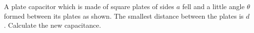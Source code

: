 \documentclass[fleqn, a4paper, 12pt, twoside]{article}
\theoremstyle{definition}
\theoremstyle{theorem}
\begin{document}
\begin{question}
	A plate capacitor which is made of square plates of sides $a$ fell and a little angle $\theta$ formed between its plates as shown.
	The smallest distance between the plates is $d$.
	Calculate the new capacitance.
	\begin{figure}[H]
	\end{figure}
\end{question}
\end{document}
